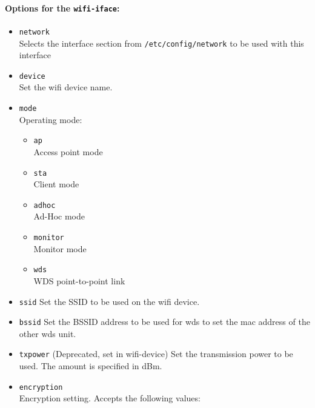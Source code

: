 \paragraph{Options for the \texttt{wifi-iface}:}

\begin{itemize}
    \item \texttt{network} \\
        Selects the interface section from \texttt{/etc/config/network} to be
        used with this interface

    \item \texttt{device} \\
	Set the wifi device name.

    \item \texttt{mode} \\
        Operating mode:

        \begin{itemize}
            \item \texttt{ap} \\
                Access point mode

            \item \texttt{sta} \\
                Client mode

            \item \texttt{adhoc} \\
                Ad-Hoc mode

            \item \texttt{monitor} \\
                Monitor mode

            \item \texttt{wds} \\
                WDS point-to-point link

        \end{itemize}

    \item \texttt{ssid}
	Set the SSID to be used on the wifi device.

    \item \texttt{bssid}
	Set the BSSID address to be used for wds to set the mac address of the other wds unit.

    \item \texttt{txpower}
	(Deprecated, set in wifi-device) Set the transmission power to be used. The amount is specified in dBm.

    \item \texttt{encryption} \\
        Encryption setting. Accepts the following values:


\end{itemize}
